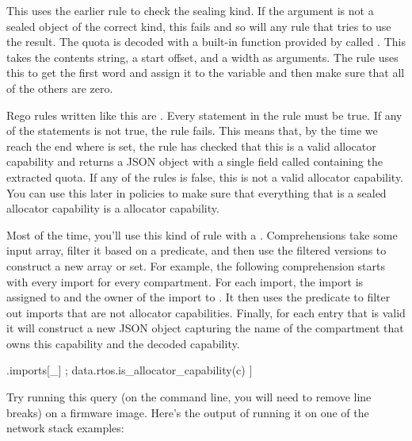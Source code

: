{This uses the earlier rule to check the sealing kind.
If the argument is not a sealed object of the correct kind, this fails and so will any rule that tries to use the result.
The quota is decoded with a built-in function provided by  called .
This takes the contents string, a start offset, and a width as arguments.
The rule uses this to get the first word and assign it to the  variable and then make sure that all of the others are zero.

Rego rules written like this are .
Every statement in the rule must be true.
If any of the statements is not true, the rule fails.
This means that, by the time we reach the end where  is set, the rule has checked that this is a valid allocator capability and returns a JSON object with a single field called  containing the extracted quota.
If any of the rules is false, this is not a valid allocator capability.
You can use this later in policies to make sure that everything that is a sealed allocator capability is a  allocator capability.

Most of the time, you'll use this kind of rule with a .
Comprehensions take some input array, filter it based on a predicate, and then use the filtered versions to construct a new array or set.
For example, the following comprehension starts with every import for every compartment.
For each import, the import is assigned to  and the owner of the import to .
It then uses the  predicate to filter out imports that are not allocator capabilities.
Finally, for each entry that is valid it will construct a new JSON object capturing the name of the compartment that owns this capability and the decoded capability.

\begin{regosnippet}
[
	{
		"owner": owner, 
		"capability": data.rtos.decode_allocator_capability(c)
	\} |
	c = input.compartments[owner].imports[_] ;
	data.rtos.is_allocator_capability(c)
]
\end{regosnippet}

Try running this query (on the command line, you will need to remove line breaks) on a firmware image.
Here's the output of running it on one of the network stack examples:

\begin{jsonsnippet}
[
  {
    "capability": {
      "quota": 4096
    \},
    "owner": "Firewall"
  \},
  {
    "capability": {
      "quota": 16384
    \},
    "owner": "SNTP"
  \},
  {
    "capability": {
      "quota": 65536
    \},
    "owner": "TCPIP"
  \}
]
\end{jsonsnippet}

}
